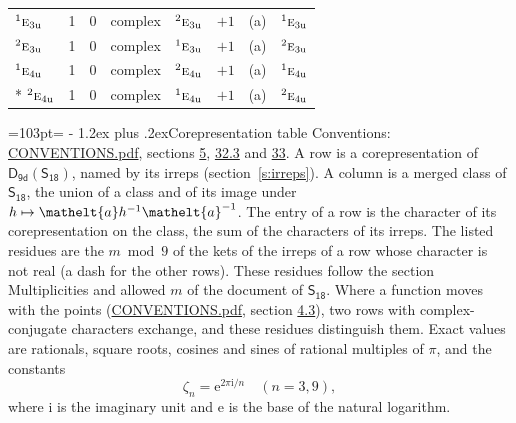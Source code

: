 \documentclass[10pt,a4paper]{article}
\makeatletter
\renewcommand\section{\@startsection{section}{1}{\z@}{-3ex plus -1ex minus -.2ex}%
  {1.2ex plus .2ex}{\normalfont\large\sffamily\bfseries\color{parttitle}}}
\newcommand{\needspace}[1]{\par\penalty-100\begingroup\dimen0=#1\relax\dimen2=\pagegoal
  \advance\dimen2-\pagetotal\ifdim\dimen0>\dimen2\relax\ifdim\dimen2>0pt\vfil\break\fi\fi
  \endgroup}
\numberwithin{equation}{section}
\newcommand{\eltfont}[1]{{\let\sigma\eltsigma\mathelt{#1}}}
\newcommand{\grp}[1]{\mathsf{#1}}
\newcommand{\irr}[1]{\text{\normalfont\scshape #1}}
\newcommand{\conjpair}[1]{{}^{#1}}
\newcommand{\elt}[1]{\eltfont{#1}}
\newcommand{\ptag}[1]{\mathrm{#1}}
\newcommand{\iunit}{\mathrm{i}}
\newcommand{\expe}{\mathrm{e}}
\newcommand{\rootunity}[1]{\zeta_{#1}}
\makeatother
\begin{document}
{\begin{longtable}{@{}lrrllrll@{}}
$\conjpair{1}\irr{e}_{3\ptag{u}}$ & 1 & $0$ & complex & $\conjpair{2}\irr{e}_{3\ptag{u}}$ & $+1$ & (a) & $\conjpair{1}\irr{e}_{3\ptag{u}}$\\
$\conjpair{2}\irr{e}_{3\ptag{u}}$ & 1 & $0$ & complex & $\conjpair{1}\irr{e}_{3\ptag{u}}$ & $+1$ & (a) & $\conjpair{2}\irr{e}_{3\ptag{u}}$\\
$\conjpair{1}\irr{e}_{4\ptag{u}}$ & 1 & $0$ & complex & $\conjpair{2}\irr{e}_{4\ptag{u}}$ & $+1$ & (a) & $\conjpair{1}\irr{e}_{4\ptag{u}}$\\*
$\conjpair{2}\irr{e}_{4\ptag{u}}$ & 1 & $0$ & complex & $\conjpair{1}\irr{e}_{4\ptag{u}}$ & $+1$ & (a) & $\conjpair{2}\irr{e}_{4\ptag{u}}$\\
\bottomrule\end{longtable}}
\needspace{103pt}
\section{Corepresentation table}\label{s:character_table}
Conventions: \href{../../CONVENTIONS.pdf}{CONVENTIONS.pdf}, sections \href{../../../rotation/CONVENTIONS.pdf\#conv.5}{5}, \href{../../CONVENTIONS.pdf\#conv.32.3}{32.3} and \href{../../CONVENTIONS.pdf\#conv.33}{33}.
A row is a corepresentation of $\grp{D_{9d}}(\grp{S_{18}})$, named by its irreps (section~\ref{s:irreps}). A column is a merged class of $\grp{S_{18}}$, the union of a class and of its image under $h \mapsto \elt{a} h^{-1} \elt{a}^{-1}$. The entry of a row is the character of its corepresentation on the class, the sum of the characters of its irreps.
\leavevmode\label{n:head.parity}The listed residues are the $m \bmod 9$ of the kets of the irreps of a row whose character is not real (a dash for the other rows). These residues follow the section Multiplicities and allowed $m$ of the document of \href{../../../rotation/data/pdf/S18.pdf}{$\grp{S_{18}}$}. Where a function moves with the points (\href{../../CONVENTIONS.pdf}{CONVENTIONS.pdf}, section \href{../../../rotation/CONVENTIONS.pdf\#conv.4.3}{4.3}), two rows with complex-conjugate characters exchange, and these residues distinguish them.
\leavevmode\label{n:constant.root}\label{n:index.root.order}Exact values are rationals, square roots, cosines and sines of rational multiples of $\pi$, and the constants
\begin{equation}\label{e:constants}\rootunity{n} = \expe^{2\pi\iunit/n}\quad(n = 3, 9),\end{equation}
where $\iunit$ is the imaginary unit and $\expe$ is the base of the natural logarithm.
\end{document}
